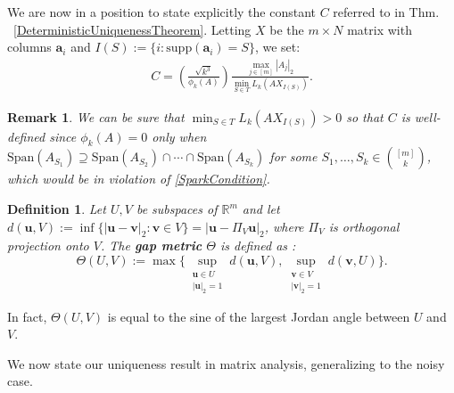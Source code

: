 \documentclass[journal, twocolumn]{IEEEtran}
\newtheorem{definition}{Definition}
\newtheorem{remark}{Remark}
\begin{document}
We are now in a position to state explicitly the constant $C$ referred to in Thm. ~\ref{DeterministicUniquenessTheorem}. Letting 
$X$ be the $m \times N$ matrix with columns $\mathbf{a}_i$ and $I(S) := \{i : \text{supp}(\mathbf{a}_i) = S\}$, we set:
\begin{align}\label{Cdef}
C = \left( \frac{ \sqrt{k^3}}{ \phi_k(A) } \right) \frac{\max_{j \in [m]} |A_j|_2}{\min_{S \in T} L_k(AX_{I(S)})}.
\end{align}

\begin{remark}\label{nonzero}
We can be sure that $\min_{S \in T} L_k(AX_{I(S)}) > 0$ so that $C$ is well-defined since $\phi_k(A) = 0$ only when $\text{Span}(A_{S_1}) \supseteq \text{Span}(A_{S_2}) \cap \cdots \cap \text{Span}(A_{S_k})$ for some $S_1, \ldots, S_k \in {[m] \choose k}$, which would be in violation of \eqref{SparkCondition}.
\end{remark}

\begin{definition}\label{GapMetricDef}
Let $U, V$ be subspaces of $\mathbb{R}^m$ and let $d(\mathbf{u},V) := \inf\{|\mathbf{u}-\mathbf{v}|_2: \mathbf{v} \in V\} = |\mathbf{u} - \Pi_V \mathbf{u}|_2$, where $\Pi_V$ is orthogonal projection onto $V$. The \textbf{gap metric} $\Theta$ is defined as \cite{Akhiezer13}:
\begin{equation*}
\Theta(U,V) := \max \big\{ \sup_{\substack{\mathbf{u} \in U \\ |\mathbf{u}|_2 = 1}} d(\mathbf{u},V), \sup_{\substack{\mathbf{v} \in V \\ |\mathbf{v}|_2 = 1}} d(\mathbf{v},U) \big\}.
\end{equation*}
\end{definition}

In fact, $\Theta(U,V)$ is equal to the sine of the largest Jordan angle between $U$ and $V$. 

We now state our uniqueness result in matrix analysis, generalizing \cite[Lem.~1]{Hillar15} to the noisy case.
\end{document}
